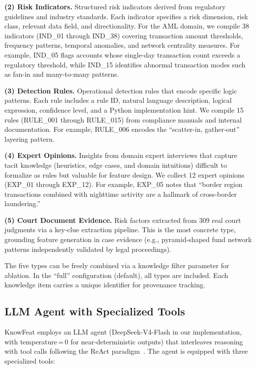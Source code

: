 \textbf{(2) Risk Indicators.} Structured risk indicators derived from regulatory guidelines and industry standards. Each indicator specifies a risk dimension, risk class, relevant data field, and directionality. For the AML domain, we compile 38 indicators (IND\_01 through IND\_38) covering transaction amount thresholds, frequency patterns, temporal anomalies, and network centrality measures. For example, IND\_05 flags accounts whose single-day transaction count exceeds a regulatory threshold, while IND\_15 identifies abnormal transaction modes such as fan-in and many-to-many patterns.

\textbf{(3) Detection Rules.} Operational detection rules that encode specific logic patterns. Each rule includes a rule ID, natural language description, logical expression, confidence level, and a Python implementation hint. We compile 15 rules (RULE\_001 through RULE\_015) from compliance manuals and internal documentation. For example, RULE\_006 encodes the ``scatter-in, gather-out'' layering pattern.

\textbf{(4) Expert Opinions.} Insights from domain expert interviews that capture tacit knowledge (heuristics, edge cases, and domain intuitions) difficult to formalize as rules but valuable for feature design. We collect 12 expert opinions (EXP\_01 through EXP\_12). For example, EXP\_05 notes that ``border region transactions combined with nighttime activity are a hallmark of cross-border laundering.''

\textbf{(5) Court Document Evidence.} Risk factors extracted from 309 real court judgments via a key-clue extraction pipeline. This is the most concrete type, grounding feature generation in case evidence (e.g., pyramid-shaped fund network patterns independently validated by legal proceedings).

The five types can be freely combined via a knowledge filter parameter for ablation. In the ``full'' configuration (default), all types are included. Each knowledge item carries a unique identifier for provenance tracking.

\subsection{LLM Agent with Specialized Tools}
\label{subsec:agent}

KnowFeat employs an LLM agent (DeepSeek-V4-Flash in our implementation, with temperature\,=\,0 for near-deterministic outputs) that interleaves reasoning with tool calls following the ReAct paradigm~\cite{yao2023react}. The agent is equipped with three specialized tools:

